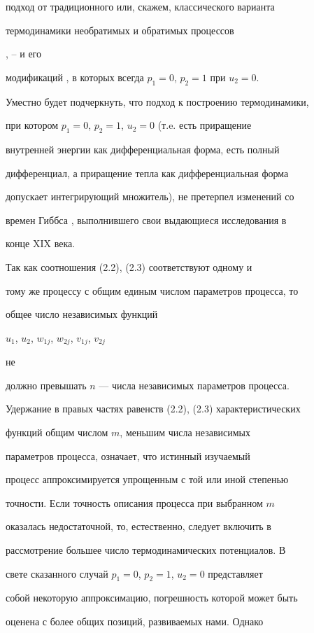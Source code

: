 подход от традиционного или, скажем, классического варианта


термодинамики необратимых и обратимых процессов


\cite{Sed}, \cite{Il}--\cite{Gri} и его


модификаций \cite{Klu}, в которых всегда $p_1=0$, $p_2=1$ при $u_2=0$.


Уместно будет подчеркнуть, что подход к построению термодинамики,


при котором $p_1=0$, $p_2=1$, $u_2=0$ (т.e. есть приращение


внутренней энергии как дифференциальная форма, есть полный


дифференциал, а приращение тепла как дифференциальная форма


допускает интегрирующий множитель), не претерпел изменений со


времен Гиббса \cite{Gib}, выполнившего свои выдающиеся исследования в


конце XIX века.





Так как соотношения (2.2), (2.3) соответствуют одному и


тому же процессу с общим единым числом параметров процесса, то


общее число независимых функций


$u_1$, $u_2$, $w_{1j}$, $w_{2j}$, $v_{1j}$, $v_{2j}$


не


должно превышать $n$ --- числа независимых параметров процесса.


Удержание в правых частях равенств (2.2), (2.3) характеристических


функций общим числом $m$, меньшим числа независимых


параметров процесса, означает, что истинный изучаемый


процесс аппроксимируется упрощенным с той или иной степенью


точности. Если точность описания процесса при выбранном $m$


оказалась недостаточной, то, естественно, следует включить в


рассмотрение большее число термодинамических потенциалов. В


свете сказанного случай $p_1=0$, $p_2=1$, $u_2=0$ представляет


собой некоторую аппроксимацию, погрешность которой может быть


оценена с более общих позиций, развиваемых нами. Однако


